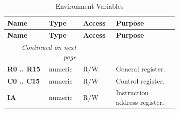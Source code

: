 \begin{longtable}{@{}p{0.2\linewidth}p{0.1\linewidth}p{0.1\linewidth}p{0.3\linewidth}@{}}
    \caption{Environment Variables} \\
    \toprule
    \textbf{Name} & \textbf{Type } & \textbf{Access } & \textbf{Purpose} \\
    \midrule
    \endfirsthead
    \toprule
    \textbf{Name} & \textbf{Type } & \textbf{Access } & \textbf{Purpose} \\
    \midrule
    \endhead
    \midrule
    \multicolumn{2}{r}{\textit{Continued on next page}} \\
    \midrule
    \endfoot
    \bottomrule
    \endlastfoot
    \textbf{R0 .. R15} & numeric & R/W & General register. \\
    \midrule
    \textbf{C0 .. C15} & numeric & R/W & Control register. \\
    \midrule
    \textbf{IA} & numeric & R/W & Instruction address register. \\
    \midrule
\end{longtable}
